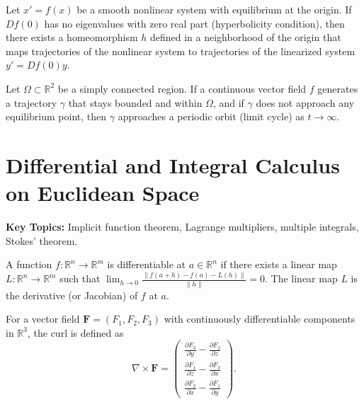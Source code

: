 \begin{theorem}
Let $x' = f(x)$ be a smooth nonlinear system with equilibrium at the origin. If $Df(0)$ has no eigenvalues with zero real part (hyperbolicity condition), then there exists a homeomorphism $h$ defined in a neighborhood of the origin that maps trajectories of the nonlinear system to trajectories of the linearized system $y' = Df(0) y$.
\end{theorem}

\begin{theorem}
Let $\Omega \subset \mathbb{R}^2$ be a simply connected region. If a continuous vector field $f$ generates a trajectory $\gamma$ that stays bounded and within $\Omega$, and if $\gamma$ does not approach any equilibrium point, then $\gamma$ approaches a periodic orbit (limit cycle) as $t \to \infty$.
\end{theorem}

\section{Differential and Integral Calculus on Euclidean Space}

\textbf{Key Topics:} Implicit function theorem, Lagrange multipliers, multiple integrals, Stokes' theorem.

\begin{definition}[Differentiability]
A function $f: \mathbb{R}^n \to \mathbb{R}^m$ is differentiable at $a \in \mathbb{R}^n$ if there exists a linear map $L: \mathbb{R}^n \to \mathbb{R}^m$ such that $\lim_{h \to 0} \frac{\|f(a+h) - f(a) - L(h)\|}{\|h\|} = 0$. The linear map $L$ is the derivative (or Jacobian) of $f$ at $a$.
\end{definition}

\begin{definition}
For a vector field $\mathbf{F} = (F_1, F_2, F_3)$ with continuously differentiable components in $\mathbb{R}^3$, the curl is defined as
\[
\nabla \times \mathbf{F} = \begin{pmatrix}
\frac{\partial F_3}{\partial y} - \frac{\partial F_2}{\partial z} \\
\frac{\partial F_1}{\partial z} - \frac{\partial F_3}{\partial x} \\
\frac{\partial F_2}{\partial x} - \frac{\partial F_1}{\partial y}
\end{pmatrix}.
\]
\end{definition}


